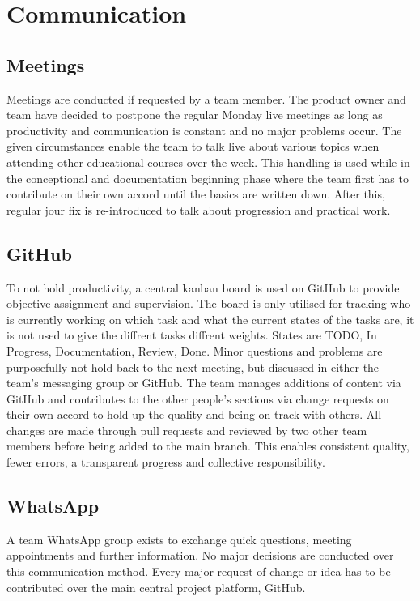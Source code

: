 \documentclass[a4paper,12pt]{article}
\begin{document}
\section{Communication}

\subsection{Meetings}
Meetings are conducted if requested by a team member.
The product owner and team have decided to postpone the regular Monday live meetings as long as productivity and communication is constant and no major problems occur.
The given circumstances enable the team to talk live about various topics when attending other educational courses over the week.
This handling is used while in the conceptional and documentation beginning phase where the team first has to contribute on their own accord until the basics are written down.
After this, regular jour fix is re-introduced to talk about progression and practical work.

\subsection{GitHub}
To not hold productivity, a central kanban board is used on GitHub to provide objective assignment and supervision.
The board is only utilised for tracking who is currently working on which task and what the current states of the tasks are, it is not used to give the diffrent tasks diffrent weights.
States are TODO, In Progress, Documentation, Review, Done.
Minor questions and problems are purposefully not hold back to the next meeting, but discussed in either the team's messaging group or GitHub.
The team manages additions of content via GitHub and contributes to the other people's sections via change requests on their own accord to hold up the quality and being on track with others.
All changes are made through pull requests and reviewed by two other team members before being added to the main branch.
This enables consistent quality, fewer errors, a transparent progress and collective responsibility.

\subsection{WhatsApp}
A team WhatsApp group exists to exchange quick questions, meeting appointments and further information.
No major decisions are conducted over this communication method.
Every major request of change or idea has to be contributed over the main central project platform, GitHub.
\end{document}
